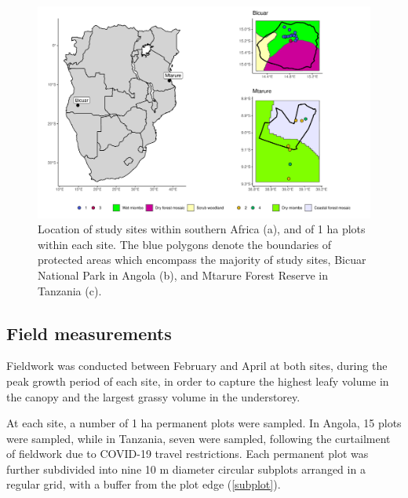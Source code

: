 \documentclass[11pt,a4paper]{article}
\begin{document}
\begin{figure}[H]
\centering
	\includegraphics[width=\textwidth]{map}
	\caption{Location of study sites within southern Africa (a), and of 1 ha plots within each site. The blue polygons denote the boundaries of protected areas which encompass the majority of study sites, Bicuar National Park in Angola (b), and Mtarure Forest Reserve in Tanzania (c).}
	\label{map}
\end{figure}

\subsection{Field measurements}

Fieldwork was conducted between February and April at both sites, during the peak growth period of each site, in order to capture the highest leafy volume in the canopy and the largest grassy volume in the understorey.

At each site, a number of 1 ha permanent plots were sampled. In Angola, 15 plots were sampled, while in Tanzania, seven were sampled, following the curtailment of fieldwork due to COVID-19 travel restrictions. Each permanent plot was further subdivided into nine 10 m diameter circular subplots arranged in a regular grid, with a buffer from the plot edge (\autoref{subplot}).
\end{document}
